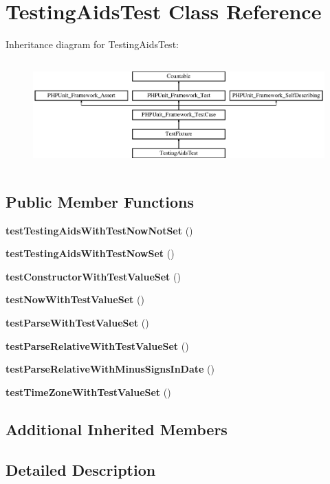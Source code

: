 \section{Testing\+Aids\+Test Class Reference}
\label{class_testing_aids_test}
Inheritance diagram for Testing\+Aids\+Test\+:\begin{figure}[H]
\begin{center}
\leavevmode
\includegraphics[height=4.129793cm]{class_testing_aids_test}
\end{center}
\end{figure}
\subsection*{Public Member Functions}
\begin{DoxyCompactItemize}
\item 
{\bf test\+Testing\+Aids\+With\+Test\+Now\+Not\+Set} ()
\item 
{\bf test\+Testing\+Aids\+With\+Test\+Now\+Set} ()
\item 
{\bf test\+Constructor\+With\+Test\+Value\+Set} ()
\item 
{\bf test\+Now\+With\+Test\+Value\+Set} ()
\item 
{\bf test\+Parse\+With\+Test\+Value\+Set} ()
\item 
{\bf test\+Parse\+Relative\+With\+Test\+Value\+Set} ()
\item 
{\bf test\+Parse\+Relative\+With\+Minus\+Signs\+In\+Date} ()
\item 
{\bf test\+Time\+Zone\+With\+Test\+Value\+Set} ()
\end{DoxyCompactItemize}
\subsection*{Additional Inherited Members}


\subsection{Detailed Description}



